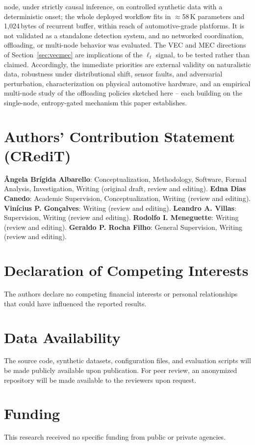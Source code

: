 \documentclass[a4paper,fleqn]{cas-dc}
\begin{document}
node, under strictly causal inference, on controlled synthetic data with a
deterministic onset; the whole deployed workflow fits in $\approx$58\,K parameters
and 1{,}024\,bytes of recurrent buffer, within reach of automotive-grade platforms.
It is not validated as a standalone detection system, and no networked coordination,
offloading, or multi-node behavior was evaluated. The VEC and MEC directions of
Section~\ref{sec:vecmec} are implications of the $\ell_t$ signal, to be tested rather
than claimed. Accordingly, the immediate priorities are external validity on
naturalistic data, robustness under distributional shift, sensor faults, and
adversarial perturbation, characterization on physical automotive hardware, and an
empirical multi-node study of the offloading policies sketched here -- each building
on the single-node, entropy-gated mechanism this paper establishes.
\section*{Authors' Contribution Statement (CRediT)}
\textbf{{\^A}ngela Br\'igida Albarello}: Conceptualization, Methodology,
Software, Formal Analysis, Investigation, Writing (original draft, review
and editing).
\textbf{Edna Dias Canedo}: Academic Supervision, Conceptualization,
Writing (review and editing).
\textbf{Vin\'icius P. Gon\c{c}alves}: Writing (review and editing).
\textbf{Leandro A. Villas}: Supervision, Writing (review and editing).
\textbf{Rodolfo I. Meneguette}: Writing (review and editing).
\textbf{Geraldo P. Rocha Filho}: General Supervision, Writing (review
and editing).
\section*{Declaration of Competing Interests}
The authors declare no competing financial interests or personal
relationships that could have influenced the reported results.
\section*{Data Availability}
The source code, synthetic datasets, configuration files, and evaluation scripts will be made publicly available upon publication. For peer review, an anonymized repository will be made available to the
reviewers upon request.
\section*{Funding}
This research received no specific funding from public or private agencies.
\end{document}
